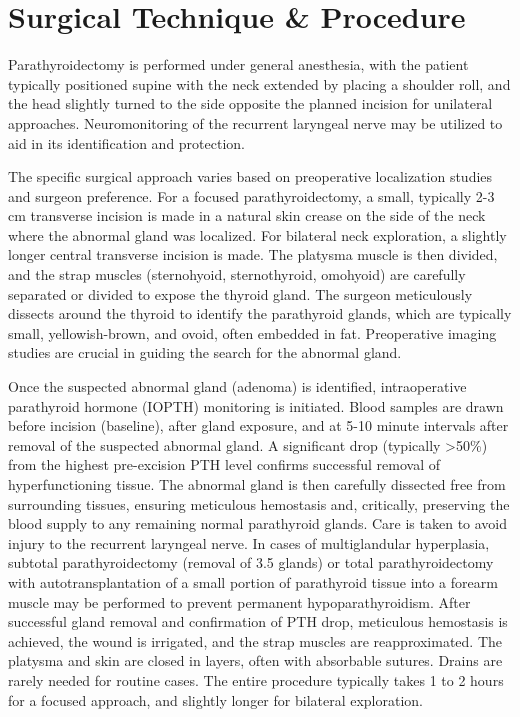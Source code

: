 \section*{Surgical Technique \& Procedure}
Parathyroidectomy is performed under general anesthesia, with the patient typically positioned supine with the neck extended by placing a shoulder roll, and the head slightly turned to the side opposite the planned incision for unilateral approaches. Neuromonitoring of the recurrent laryngeal nerve may be utilized to aid in its identification and protection.

The specific surgical approach varies based on preoperative localization studies and surgeon preference. For a focused parathyroidectomy, a small, typically 2-3 cm transverse incision is made in a natural skin crease on the side of the neck where the abnormal gland was localized. For bilateral neck exploration, a slightly longer central transverse incision is made. The platysma muscle is then divided, and the strap muscles (sternohyoid, sternothyroid, omohyoid) are carefully separated or divided to expose the thyroid gland. The surgeon meticulously dissects around the thyroid to identify the parathyroid glands, which are typically small, yellowish-brown, and ovoid, often embedded in fat. Preoperative imaging studies are crucial in guiding the search for the abnormal gland.

Once the suspected abnormal gland (adenoma) is identified, intraoperative parathyroid hormone (IOPTH) monitoring is initiated. Blood samples are drawn before incision (baseline), after gland exposure, and at 5-10 minute intervals after removal of the suspected abnormal gland. A significant drop (typically >50\%) from the highest pre-excision PTH level confirms successful removal of hyperfunctioning tissue. The abnormal gland is then carefully dissected free from surrounding tissues, ensuring meticulous hemostasis and, critically, preserving the blood supply to any remaining normal parathyroid glands. Care is taken to avoid injury to the recurrent laryngeal nerve. In cases of multiglandular hyperplasia, subtotal parathyroidectomy (removal of 3.5 glands) or total parathyroidectomy with autotransplantation of a small portion of parathyroid tissue into a forearm muscle may be performed to prevent permanent hypoparathyroidism. After successful gland removal and confirmation of PTH drop, meticulous hemostasis is achieved, the wound is irrigated, and the strap muscles are reapproximated. The platysma and skin are closed in layers, often with absorbable sutures. Drains are rarely needed for routine cases. The entire procedure typically takes 1 to 2 hours for a focused approach, and slightly longer for bilateral exploration.

